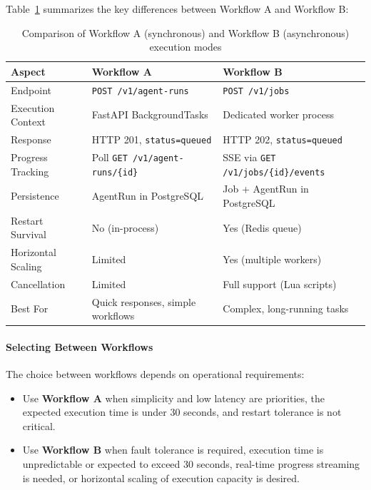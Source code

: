 Table~\ref{tab:workflow-comparison} summarizes the key differences between Workflow A and Workflow B:

\begin{table}[htbp]
\centering
\caption{Comparison of Workflow A (synchronous) and Workflow B (asynchronous) execution modes}
\label{tab:workflow-comparison}
\small
\begin{tabular}{lll}
\hline
\textbf{Aspect} & \textbf{Workflow A} & \textbf{Workflow B} \\
\midrule
Endpoint & \texttt{POST /v1/agent-runs} & \texttt{POST /v1/jobs} \\
Execution Context & FastAPI BackgroundTasks & Dedicated worker process \\
Response & HTTP 201, \texttt{status=queued} & HTTP 202, \texttt{status=queued} \\
Progress Tracking & Poll \texttt{GET /v1/agent-runs/\{id\}} & SSE via \texttt{GET /v1/jobs/\{id\}/events} \\
Persistence & AgentRun in PostgreSQL & Job + AgentRun in PostgreSQL \\
Restart Survival & No (in-process) & Yes (Redis queue) \\
Horizontal Scaling & Limited & Yes (multiple workers) \\
Cancellation & Limited & Full support (Lua scripts) \\
Best For & Quick responses, simple workflows & Complex, long-running tasks \\
\hline
\end{tabular}
\end{table}

\paragraph{Selecting Between Workflows} The choice between workflows depends on operational requirements:

\begin{itemize}
    \item Use \textbf{Workflow A} when simplicity and low latency are priorities, the expected execution time is under 30 seconds, and restart tolerance is not critical.
    \item Use \textbf{Workflow B} when fault tolerance is required, execution time is unpredictable or expected to exceed 30 seconds, real-time progress streaming is needed, or horizontal scaling of execution capacity is desired.
\end{itemize}

